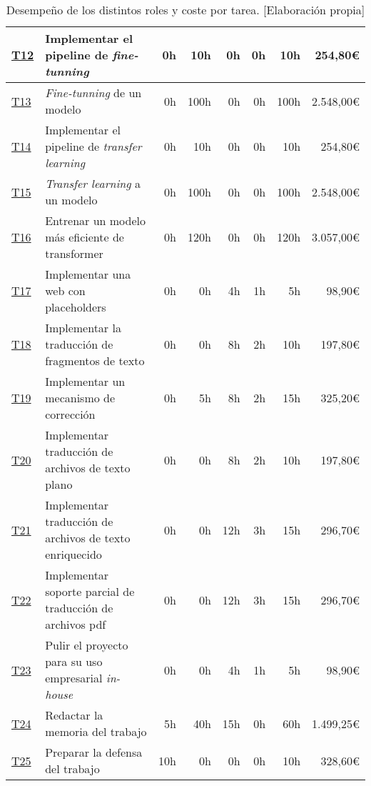 \begin{landscape}
\begin{table}
\begin{tabular}{  l  l  r  r  r  r  r  r  }
        \hline
        \hyperref[T12]{T12} & Implementar el pipeline de \textit{fine-tunning} & 0h & 10h & 0h & 0h & 10h & 254,80\euro\\
        \hline
        \hyperref[T13]{T13} & \textit{Fine-tunning} de un modelo & 0h & 100h & 0h & 0h & 100h & 2.548,00\euro\\
        \hline
        \hyperref[T14]{T14} & Implementar el pipeline de \textit{transfer learning} & 0h & 10h & 0h & 0h & 10h & 254,80\euro\\
        \hline
        \hyperref[T15]{T15} & \textit{Transfer learning} a un modelo & 0h & 100h & 0h & 0h & 100h & 2.548,00\euro\\
        \hline
        \hyperref[T16]{T16} & Entrenar un modelo más eficiente de transformer & 0h & 120h & 0h & 0h & 120h & 3.057,00\euro\\
        \hline
        \hyperref[T17]{T17} & Implementar una web con placeholders & 0h & 0h & 4h & 1h & 5h & 98,90\euro\\
        \hline
        \hyperref[T18]{T18} & Implementar la traducción de fragmentos de texto & 0h & 0h & 8h & 2h & 10h & 197,80\euro\\
        \hline
        \hyperref[T19]{T19} & Implementar un mecanismo de corrección & 0h & 5h & 8h & 2h & 15h & 325,20\euro\\
        \hline
        \hyperref[T20]{T20} & Implementar traducción de archivos de texto plano & 0h & 0h & 8h & 2h & 10h & 197,80\euro\\
        \hline
        \hyperref[T21]{T21} & Implementar traducción de archivos de texto enriquecido & 0h & 0h & 12h & 3h & 15h & 296,70\euro\\
        \hline
        \hyperref[T22]{T22} & Implementar soporte parcial de traducción de archivos pdf & 0h & 0h & 12h & 3h & 15h & 296,70\euro\\
        \hline
        \hyperref[T23]{T23} & Pulir el proyecto para su uso empresarial \textit{in-house} & 0h & 0h & 4h & 1h & 5h & 98,90\euro\\
        \hline
        \hyperref[T24]{T24} & Redactar la memoria del trabajo & 5h & 40h & 15h & 0h & 60h & 1.499,25\euro\\
        \hline
        \hyperref[T25]{T25} & Preparar la defensa del trabajo & 10h & 0h & 0h & 0h & 10h & 328,60\euro\\
        \hline
    \end{tabular}
    \caption{Desempeño de los distintos roles y coste por tarea. [Elaboración propia]}\label{taskroledecompos}
    \end{table}
\end{landscape}
\restoregeometry

